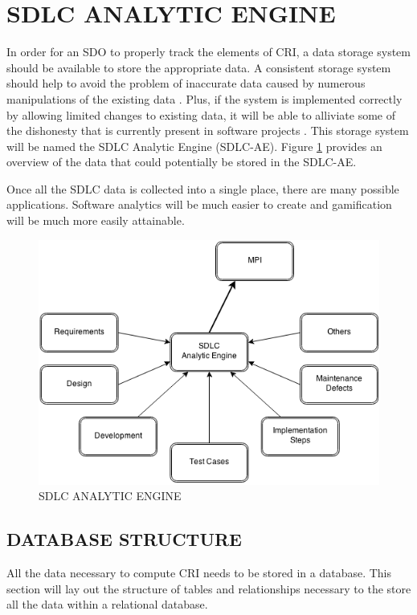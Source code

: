 \documentclass[SDSUThesis.tex]{subfiles}
\begin{document}
\section{SDLC ANALYTIC ENGINE}
\label{sec:SDLC-AE}

In order for an SDO to properly track the elements of CRI, a data storage system should be available to store the appropriate data.  A consistent storage system should help to avoid the problem of inaccurate
data caused by numerous manipulations of the existing data \cite{Olson2003}. Plus, if the system
is implemented correctly by allowing limited changes to existing data, it will be able to alliviate
some of the dishonesty that is currently present in software projects \cite{Rost2011}. This storage system will be named the SDLC Analytic Engine (SDLC-AE). Figure \ref{fig:sdlc-ae} provides an overview of the data that could potentially be stored in the SDLC-AE.


Once all the SDLC data is collected into a single place, there are many possible applications.  Software analytics
will be much easier to create and gamification will be much more easily attainable.  

\begin{figure}[ht]
\includegraphics[scale=.7]{images/sdlc-ae.png}
\caption{SDLC ANALYTIC ENGINE}
\label{fig:sdlc-ae}
\end{figure}

\subsection{DATABASE STRUCTURE}
   All the data necessary to compute CRI needs to be stored in a database.  This section will 
   lay out the structure of tables and relationships necessary to the store all the data
   within a relational database.  
   
\end{document}
